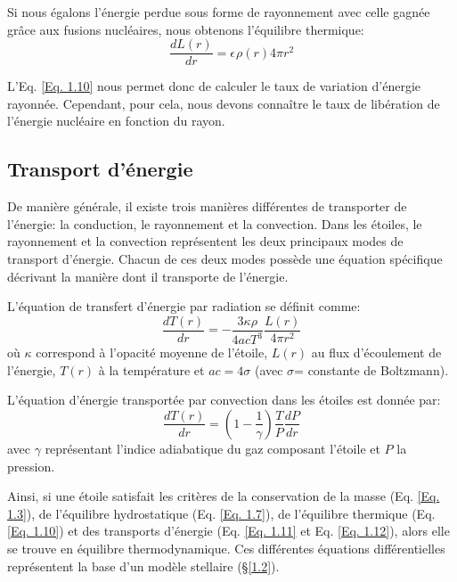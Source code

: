 Si nous égalons l'énergie perdue sous forme de rayonnement avec celle gagnée grâce aux fusions nucléaires, nous obtenons l'équilibre thermique:\begin{equation}\boxed{\dfrac{dL(r)}{dr}=\epsilon\hspace{1pt}\rho(r) 4\pi r^{2}}\label{Eq. 1.10}\end{equation}

L'Eq. \ref{Eq. 1.10} nous permet donc de calculer le taux de variation d'énergie rayonnée. Cependant, pour cela, nous devons connaître le taux de libération de l'énergie nucléaire en fonction du rayon. 


\subsection{Transport d'énergie}\label{1.1.4}

De manière générale, il existe trois manières différentes de transporter de l'énergie: la conduction, le rayonnement et la convection. Dans les étoiles, le rayonnement et la convection représentent les deux principaux modes de transport d'énergie. Chacun de ces deux modes possède une équation spécifique décrivant la manière dont il transporte de l'énergie\footnotemark[4]\smallskip.

L'équation de transfert d'énergie par radiation se définit comme:\begin{equation}\boxed{\dfrac{dT(r)}{dr}=-\dfrac{3\kappa\rho}{4acT^{3}}\dfrac{L(r)}{4\pi r^{2}}}\label{Eq. 1.11}\end{equation} où $\kappa$ correspond à l'opacité moyenne de l'étoile, $L(r)$ au flux d'écoulement de l'énergie, $T(r)$ à la température et $ac=4\sigma$ (avec $\sigma$= constante de Boltzmann).\smallskip

L'équation d'énergie transportée par convection dans les étoiles est donnée par:\begin{equation}\boxed{\dfrac{dT(r)}{dr}= \left(1-\dfrac{1}{\gamma}\right)\dfrac{T}{P}\dfrac{dP}{dr}}\label{Eq. 1.12}\end{equation} avec $\gamma$ représentant l'indice adiabatique du gaz composant l'étoile et $P$ la pression.\bigskip

Ainsi, si une étoile satisfait les critères de la conservation de la masse (Eq. \ref{Eq. 1.3}), de l'équilibre hydrostatique (Eq. \ref{Eq. 1.7}), de l'équilibre thermique (Eq. \ref{Eq. 1.10}) et des transports d'énergie (Eq. \ref{Eq. 1.11} et Eq. \ref{Eq. 1.12}), alors elle se trouve en équilibre thermodynamique. Ces différentes équations différentielles représentent la base d'un modèle stellaire (§\ref{1.2}).

